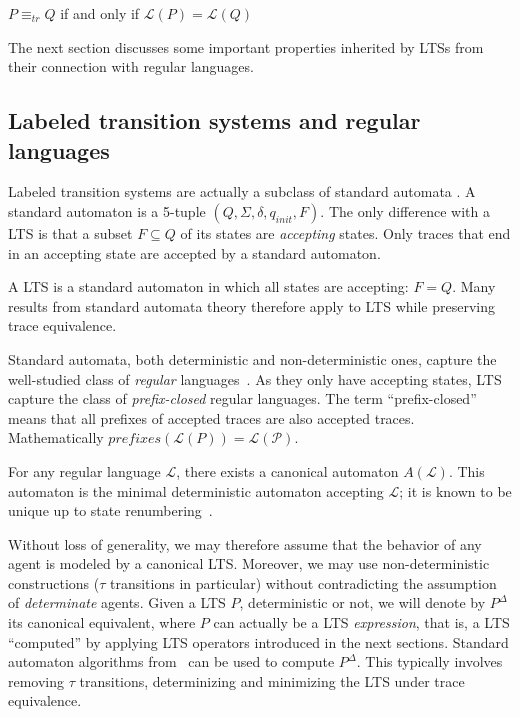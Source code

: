 \begin{center}
$P \equiv_{tr} Q$ if and only if $\mathcal{L}(P) = \mathcal{L}(Q)$
\end{center}

The next section discusses some important properties inherited by LTSs from their connection with regular languages. 

\subsection{Labeled transition systems and regular languages\label{section:background-lts-and-regular-languages}}

Labeled transition systems are actually a subclass of standard automata \cite{Hopcroft:1979}. A standard automaton is a 5-tuple $(Q,\Sigma,\delta,q_{init},F)$. The only difference with a LTS is that a subset $F \subseteq Q$ of its states are \emph{accepting} states. Only traces that end in an accepting state are accepted by a standard automaton. 

A LTS is a standard automaton in which all states are accepting: $F = Q$. Many results from standard automata theory therefore apply to LTS while preserving trace equivalence.

Standard automata, both deterministic and non-deterministic ones, capture the well-studied class of \emph{regular} languages~\cite{Hopcroft:1979}. As they only have accepting states, LTS capture the class of \emph{prefix-closed} regular languages. The term ``prefix-closed'' means that all prefixes of accepted traces are also accepted traces. Mathematically $prefixes(\mathcal{L}(P)) = \mathcal{L(P)}$.

For any regular language $\mathcal{L}$, there exists a canonical automaton $A(\mathcal{L})$. This automaton is the minimal deterministic automaton accepting $\mathcal{L}$; it is known to be unique up to state renumbering~\cite{Gold:1978}. 

Without loss of generality, we may therefore assume that the behavior of any agent is modeled by a canonical LTS. Moreover, we may use non-deterministic constructions ($\tau$ transitions in particular) without contradicting the assumption of \emph{determinate} agents. Given a LTS $P$, deterministic or not, we will denote by $P^{\Delta}$ its canonical equivalent, where $P$ can actually be a LTS \emph{expression}, that is, a LTS ``computed'' by applying LTS operators introduced in the next sections. Standard automaton algorithms from~\cite{Hopcroft:1979} can be used to compute $P^\Delta$. This typically involves removing $\tau$ transitions, determinizing and minimizing the LTS under trace equivalence.

